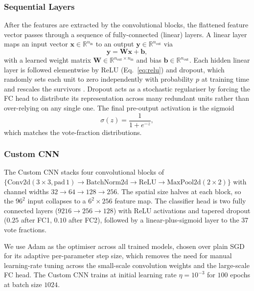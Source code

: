 \documentclass[10pt,preprint2]{aastex}
\begin{document}
\subsubsection{Sequential Layers}

After the features are extracted by the convolutional blocks, the flattened feature vector passes through a sequence of fully-connected (linear) layers. A linear layer maps an input vector $\mathbf{x} \in \mathbb{R}^{n_{\mathrm{in}}}$ to an output $\mathbf{y} \in \mathbb{R}^{n_{\mathrm{out}}}$ via
\begin{equation}
  \mathbf{y} = \mathbf{W}\mathbf{x} + \mathbf{b},
  \label{eq:linear}
\end{equation}
with a learned weight matrix $\mathbf{W} \in \mathbb{R}^{n_{\mathrm{out}} \times n_{\mathrm{in}}}$ and bias $\mathbf{b} \in \mathbb{R}^{n_{\mathrm{out}}}$. Each hidden linear layer is followed elementwise by ReLU (Eq.~\ref{eq:relu}) and dropout, which randomly sets each unit to zero independently with probability $p$ at training time and rescales the survivors \citep{Srivastava2014}. Dropout acts as a stochastic regulariser by forcing the FC head to distribute its representation across many redundant units rather than over-relying on any single one. The final pre-output activation is the sigmoid
\begin{equation}
  \sigma(z) = \frac{1}{1 + e^{-z}},
  \label{eq:sigmoid}
\end{equation}
which matches the vote-fraction distributions.

\subsubsection{Custom CNN}

The Custom CNN stacks four convolutional blocks of $\{\mathrm{Conv2d}(3\times3, \mathrm{pad}\,1) \to \mathrm{BatchNorm2d} \to \mathrm{ReLU} \to \mathrm{MaxPool2d}(2\times2)\}$ with channel widths $32 \to 64 \to 128 \to 256$. The spatial size halves at each block, so the $96^2$ input collapses to a $6^2 \times 256$ feature map. The classifier head is two fully connected layers ($9216 \to 256 \to 128$) with ReLU activations and tapered dropout ($0.25$ after FC1, $0.10$ after FC2), followed by a linear-plus-sigmoid layer to the 37 vote fractions.

We use Adam \citep{KingmaBa2014} as the optimiser across all trained models, chosen over plain SGD for its adaptive per-parameter step size, which removes the need for manual learning-rate tuning across the small-scale convolution weights and the large-scale FC head. The Custom CNN trains at initial learning rate $\eta = 10^{-3}$ for $100$ epochs at batch size $1024$.
\end{document}
